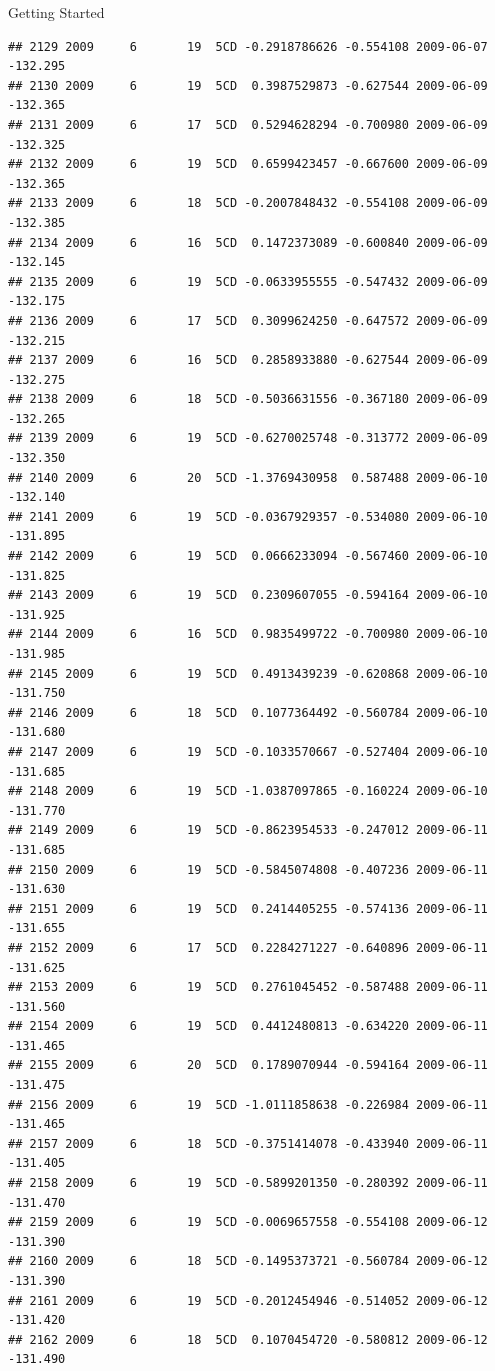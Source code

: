 \documentclass[
  ignorenonframetext,
]{beamer}
\begin{document}
\begin{frame}[fragile]{Getting Started}
\begin{verbatim}
## 2129 2009     6       19  5CD -0.2918786626 -0.554108 2009-06-07 -132.295
## 2130 2009     6       19  5CD  0.3987529873 -0.627544 2009-06-09 -132.365
## 2131 2009     6       17  5CD  0.5294628294 -0.700980 2009-06-09 -132.325
## 2132 2009     6       19  5CD  0.6599423457 -0.667600 2009-06-09 -132.365
## 2133 2009     6       18  5CD -0.2007848432 -0.554108 2009-06-09 -132.385
## 2134 2009     6       16  5CD  0.1472373089 -0.600840 2009-06-09 -132.145
## 2135 2009     6       19  5CD -0.0633955555 -0.547432 2009-06-09 -132.175
## 2136 2009     6       17  5CD  0.3099624250 -0.647572 2009-06-09 -132.215
## 2137 2009     6       16  5CD  0.2858933880 -0.627544 2009-06-09 -132.275
## 2138 2009     6       18  5CD -0.5036631556 -0.367180 2009-06-09 -132.265
## 2139 2009     6       19  5CD -0.6270025748 -0.313772 2009-06-09 -132.350
## 2140 2009     6       20  5CD -1.3769430958  0.587488 2009-06-10 -132.140
## 2141 2009     6       19  5CD -0.0367929357 -0.534080 2009-06-10 -131.895
## 2142 2009     6       19  5CD  0.0666233094 -0.567460 2009-06-10 -131.825
## 2143 2009     6       19  5CD  0.2309607055 -0.594164 2009-06-10 -131.925
## 2144 2009     6       16  5CD  0.9835499722 -0.700980 2009-06-10 -131.985
## 2145 2009     6       19  5CD  0.4913439239 -0.620868 2009-06-10 -131.750
## 2146 2009     6       18  5CD  0.1077364492 -0.560784 2009-06-10 -131.680
## 2147 2009     6       19  5CD -0.1033570667 -0.527404 2009-06-10 -131.685
## 2148 2009     6       19  5CD -1.0387097865 -0.160224 2009-06-10 -131.770
## 2149 2009     6       19  5CD -0.8623954533 -0.247012 2009-06-11 -131.685
## 2150 2009     6       19  5CD -0.5845074808 -0.407236 2009-06-11 -131.630
## 2151 2009     6       19  5CD  0.2414405255 -0.574136 2009-06-11 -131.655
## 2152 2009     6       17  5CD  0.2284271227 -0.640896 2009-06-11 -131.625
## 2153 2009     6       19  5CD  0.2761045452 -0.587488 2009-06-11 -131.560
## 2154 2009     6       19  5CD  0.4412480813 -0.634220 2009-06-11 -131.465
## 2155 2009     6       20  5CD  0.1789070944 -0.594164 2009-06-11 -131.475
## 2156 2009     6       19  5CD -1.0111858638 -0.226984 2009-06-11 -131.465
## 2157 2009     6       18  5CD -0.3751414078 -0.433940 2009-06-11 -131.405
## 2158 2009     6       19  5CD -0.5899201350 -0.280392 2009-06-11 -131.470
## 2159 2009     6       19  5CD -0.0069657558 -0.554108 2009-06-12 -131.390
## 2160 2009     6       18  5CD -0.1495373721 -0.560784 2009-06-12 -131.390
## 2161 2009     6       19  5CD -0.2012454946 -0.514052 2009-06-12 -131.420
## 2162 2009     6       18  5CD  0.1070454720 -0.580812 2009-06-12 -131.490

\end{verbatim}
\end{frame}
\end{document}
